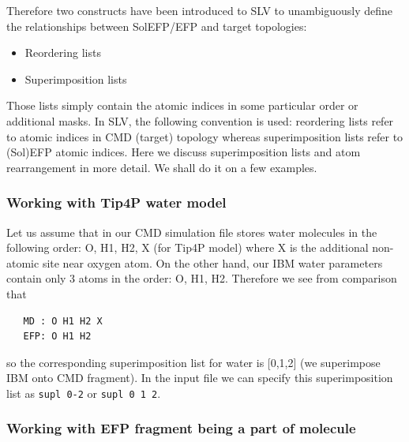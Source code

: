 \documentclass[a4paper,titlepage,twoside,fleqn,12pt]{book}
\begin{document}
\begin{refsection}
Therefore two constructs have been introduced to SLV to unambiguously define the relationships
between SolEFP/EFP and target topologies:
%
\begin{itemize}
\item Reordering lists
\item Superimposition lists
\end{itemize}
%
Those lists simply contain the atomic indices in some particular order or additional masks. In SLV, the
following convention is used: reordering lists refer to atomic indices in CMD (target) topology whereas
superimposition lists refer to (Sol)EFP atomic indices.
Here we discuss superimposition lists and atom rearrangement
in more detail. We shall do it on a few examples.

\subsubsection{Working with Tip4P water model}

Let us assume that in our CMD simulation file stores water molecules in the following order: 
O, H1, H2, X (for Tip4P model) where X is the additional non\hyp{}atomic
site near oxygen atom. On the other hand, our IBM water parameters
contain only 3 atoms in the order: O, H1, H2. Therefore we see from comparison that
%
\begin{verbatim}
   MD : O H1 H2 X
   EFP: O H1 H2
\end{verbatim}
%
so the corresponding superimposition list for water is [0,1,2] (we superimpose IBM onto CMD
fragment). In the input file we can specify this superimposition
list as {\tt supl 0-2} or {\tt supl 0 1 2}.

\subsubsection{Working with EFP fragment being a part of molecule}


\end{refsection}
\end{document}
